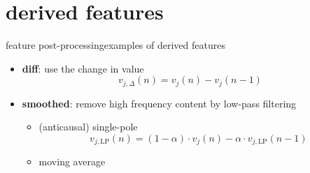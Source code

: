     \section[derived]{derived features}
		\begin{frame}{feature post-processing}{examples of derived features}
                \begin{itemize}
                    \item   \textbf{diff}: use the change in value
                        \begin{equation*}
                            v_{j,\Delta}(n) = v_j(n) - v_j(n-1) 
                        \end{equation*}
                    \smallskip
                    \item<2-> \textbf{smoothed}: remove high frequency content by low-pass filtering
                        \begin{itemize}
                            \item	 (anticausal) single-pole
                                \begin{equation*}
                                    v_{j,\mathrm{LP}}(n) = (1-\alpha)\cdot v_j(n) - \alpha\cdot v_{j,\mathrm{LP}}(n-1) 
                                \end{equation*}
                            \item	moving average
                        \end{itemize}
                \end{itemize}
                
		\end{frame}

